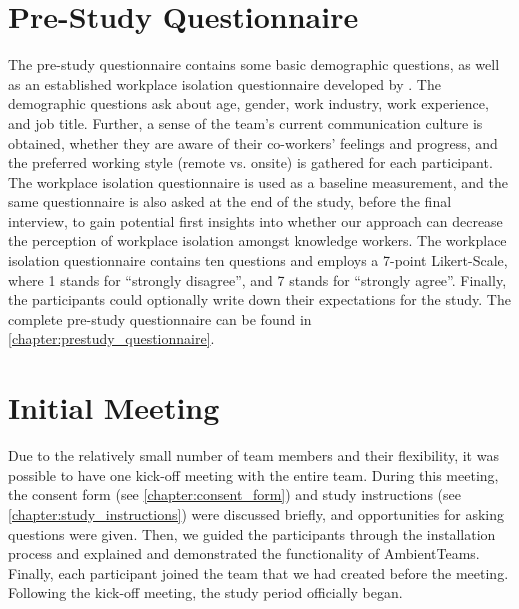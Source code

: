 \section{Pre-Study Questionnaire}
\label{section:prestudy_questionnaire}
The pre-study questionnaire contains some basic demographic questions, as well as an established workplace isolation questionnaire developed by \textcite{marshall2007workplace}. The demographic questions ask about age, gender, work industry, work experience, and job title. Further, a sense of the team's current communication culture is obtained, whether they are aware of their co-workers' feelings and progress, and the preferred working style (remote vs. onsite) is gathered for each participant. The workplace isolation questionnaire is used as a baseline measurement, and the same questionnaire is also asked at the end of the study, before the final interview, to gain potential first insights into whether our approach can decrease the perception of workplace isolation amongst knowledge workers. The workplace isolation questionnaire contains ten questions and employs a 7-point Likert-Scale, where 1 stands for \enquote{strongly disagree}, and 7 stands for \enquote{strongly agree}. Finally, the participants could optionally write down their expectations for the study. The complete pre-study questionnaire can be found in \autoref{chapter:prestudy_questionnaire}.

\section{Initial Meeting}
\label{section:initial_meeting}
Due to the relatively small number of team members and their flexibility, it was possible to have one kick-off meeting with the entire team. During this meeting, the consent form (see \autoref{chapter:consent_form}) and study instructions (see \autoref{chapter:study_instructions}) were discussed briefly, and opportunities for asking questions were given. Then, we guided the participants through the installation process and explained and demonstrated the functionality of AmbientTeams. Finally, each participant joined the team that we had created before the meeting. Following the kick-off meeting, the study period officially began.

